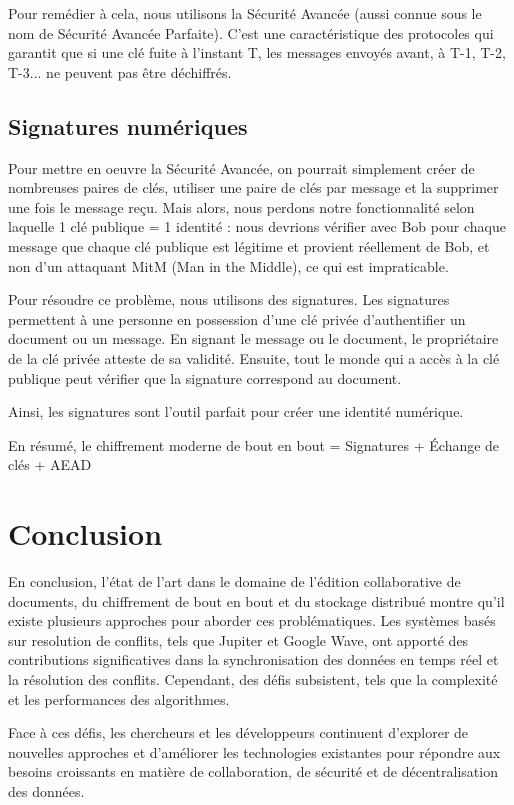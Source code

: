 Pour remédier à cela, nous utilisons la Sécurité Avancée (aussi connue sous le nom de Sécurité Avancée Parfaite). C'est une caractéristique des protocoles qui garantit que si une clé fuite à l'instant T, les messages envoyés avant, à T-1, T-2, T-3... ne peuvent pas être déchiffrés.

\subsection{Signatures numériques}

Pour mettre en oeuvre la Sécurité Avancée, on pourrait simplement créer de nombreuses paires de clés, utiliser une paire de clés par message et la supprimer une fois le message reçu. Mais alors, nous perdons notre fonctionnalité selon laquelle 1 clé publique = 1 identité : nous devrions vérifier avec Bob pour chaque message que chaque clé publique est légitime et provient réellement de Bob, et non d'un attaquant \Gls{MitM} (Man in the Middle), ce qui est impraticable.

Pour résoudre ce problème, nous utilisons des signatures. Les signatures permettent à une personne en possession d'une clé privée d'authentifier un document ou un message. En signant le message ou le document, le propriétaire de la clé privée atteste de sa validité. Ensuite, tout le monde qui a accès à la clé publique peut vérifier que la signature correspond au document.

Ainsi, les signatures sont l'outil parfait pour créer une identité numérique.

En résumé, le chiffrement moderne de bout en bout = Signatures + Échange de clés + AEAD

\section{Conclusion}
En conclusion, l'état de l'art dans le domaine de l'édition collaborative de
documents, du chiffrement de bout en bout et du stockage distribué montre qu'il
existe plusieurs approches pour aborder ces problématiques. Les systèmes basés
sur resolution de conflits, tels que Jupiter et Google Wave, ont apporté des
contributions significatives dans la synchronisation des données en temps réel
et la résolution des conflits. Cependant, des défis subsistent, tels que la
complexité et les performances des algorithmes.

Face à ces défis, les chercheurs et les développeurs continuent d'explorer de nouvelles approches et d'améliorer les technologies existantes pour répondre aux besoins croissants en matière de collaboration, de sécurité et de décentralisation des données.